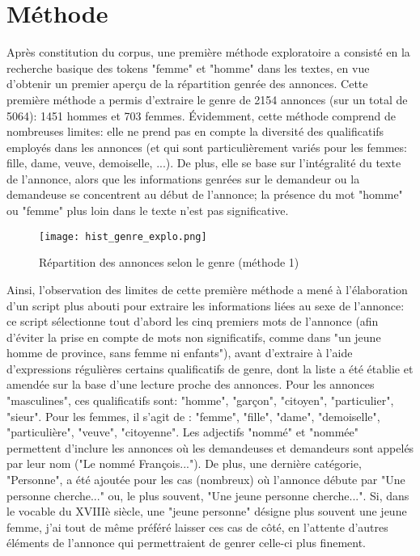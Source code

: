 \section{Méthode}

Après constitution du corpus, une première méthode exploratoire a consisté en la recherche basique des tokens "femme" et "homme" dans les textes, en vue d'obtenir un premier aperçu de la répartition genrée des annonces. Cette première méthode a permis d'extraire le genre de 2154 annonces (sur un total de 5064): 1451 hommes et 703 femmes. Évidemment, cette méthode comprend de nombreuses limites: elle ne prend pas en compte la diversité des qualificatifs employés dans les annonces (et qui sont particulièrement variés pour les femmes: fille, dame, veuve, demoiselle, ...). De plus, elle se base sur l'intégralité du texte de l'annonce, alors que les informations genrées sur le demandeur ou la demandeuse se concentrent au début de l'annonce; la présence du mot "homme" ou "femme" plus loin dans le texte n'est pas significative. 

\begin{figure}[h]
	\centering
	\texttt{[image: hist\_genre\_explo.png]}
	\caption{Répartition des annonces selon le genre (méthode 1)}
\end{figure}


Ainsi, l'observation des limites de cette première méthode a mené à l'élaboration d'un script plus abouti pour extraire les informations liées au sexe de l'annonce: ce script sélectionne tout d'abord les cinq premiers mots de l'annonce (afin d'éviter la prise en compte de mots non significatifs, comme dans "un jeune homme de province, sans femme ni enfants"), avant d'extraire à l'aide d'expressions régulières certains qualificatifs de genre, dont la liste a été établie et amendée sur la base d'une lecture proche des annonces. Pour les annonces "masculines", ces qualificatifs sont: "homme", "garçon", "citoyen", "particulier", "sieur". Pour les femmes, il s'agit de : "femme", "fille", "dame", "demoiselle", "particulière", "veuve", "citoyenne". Les adjectifs "nommé" et "nommée" permettent d'inclure les annonces où les demandeuses et demandeurs sont appelés par leur nom ("Le nommé François..."). De plus, une dernière catégorie, "Personne", a été ajoutée pour les cas (nombreux) où l'annonce débute par "Une personne cherche..." ou, le plus souvent, "Une jeune personne cherche...". Si, dans le vocable du XVIIIè siècle, une "jeune personne" désigne plus souvent une jeune femme, j'ai tout de même préféré laisser ces cas de côté, en l'attente d'autres éléments de l'annonce qui permettraient de genrer celle-ci plus finement. 


